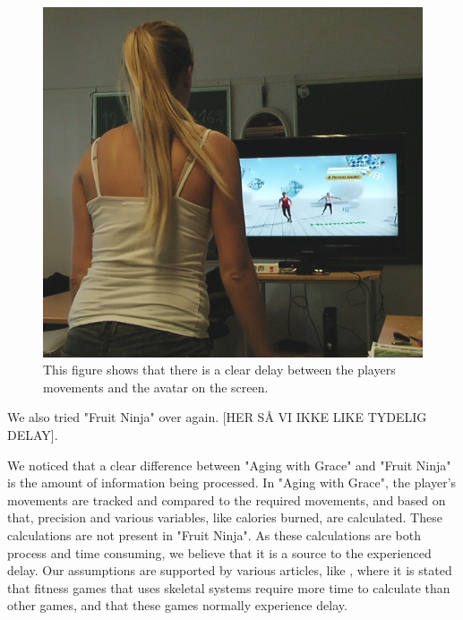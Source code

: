 \begin{figure} [H]
\centering
\includegraphics[scale=0.6]{kineDelay.jpg}
\caption[Kinect sensor delay]{This figure shows that there is a clear delay between the players movements and the avatar on the screen.}
\label{fig:remakeDelay}
\end{figure} 

We also tried "Fruit Ninja" over again. [HER SÅ VI IKKE LIKE TYDELIG DELAY].

We noticed that a clear difference between "Aging with Grace" and "Fruit Ninja" is the amount of information being processed. In "Aging with Grace", the player's movements are tracked and compared to the required movements, and based on that, precision and various variables, like calories burned, are calculated. These calculations are not present in "Fruit Ninja". As these calculations are both process and time consuming, we believe that it is a source to the experienced delay. Our assumptions are supported by various articles, like \cite{kinectLag}, where it is stated that fitness games that uses skeletal systems require more time to calculate than other games, and that these games normally experience delay. 

